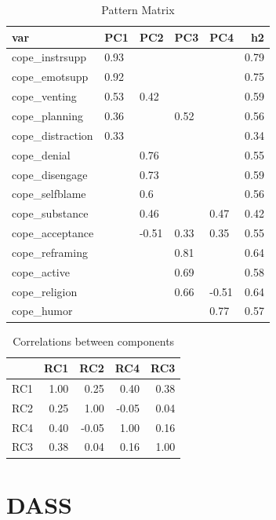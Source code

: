 \documentclass[]{article}
\begin{document}
\begin{table}[H]

\caption{\label{tab:unnamed-chunk-21}Pattern Matrix}
\centering
\fontsize{6}{8}\selectfont
\begin{tabular}[t]{lllllr}
\toprule
var & PC1 & PC2 & PC3 & PC4 & h2\\
\midrule
cope\_instrsupp & 0.93 &  &  &  & 0.79\\
cope\_emotsupp & 0.92 &  &  &  & 0.75\\
cope\_venting & 0.53 & 0.42 &  &  & 0.59\\
cope\_planning & 0.36 &  & 0.52 &  & 0.56\\
cope\_distraction & 0.33 &  &  &  & 0.34\\
\addlinespace
cope\_denial &  & 0.76 &  &  & 0.55\\
cope\_disengage &  & 0.73 &  &  & 0.59\\
cope\_selfblame &  & 0.6 &  &  & 0.56\\
cope\_substance &  & 0.46 &  & 0.47 & 0.42\\
cope\_acceptance &  & -0.51 & 0.33 & 0.35 & 0.55\\
\addlinespace
cope\_reframing &  &  & 0.81 &  & 0.64\\
cope\_active &  &  & 0.69 &  & 0.58\\
cope\_religion &  &  & 0.66 & -0.51 & 0.64\\
cope\_humor &  &  &  & 0.77 & 0.57\\
\bottomrule
\end{tabular}
\end{table}

\begin{table}[H]

\caption{\label{tab:unnamed-chunk-21}Correlations between components}
\centering
\fontsize{6}{8}\selectfont
\begin{tabular}[t]{lrrrr}
\toprule
  & RC1 & RC2 & RC4 & RC3\\
\midrule
RC1 & 1.00 & 0.25 & 0.40 & 0.38\\
RC2 & 0.25 & 1.00 & -0.05 & 0.04\\
RC4 & 0.40 & -0.05 & 1.00 & 0.16\\
RC3 & 0.38 & 0.04 & 0.16 & 1.00\\
\bottomrule
\end{tabular}
\end{table}

\newpage

\hypertarget{dass}{%
\section{DASS}\label{dass}}
\end{document}
